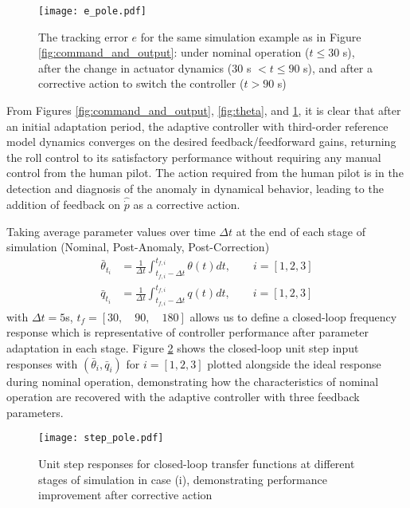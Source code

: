 \begin{figure}[h!]
	\centering
	\texttt{[image: e\_pole.pdf]}
	\caption{The tracking error $e$ for the same simulation example as in Figure \ref{fig:command_and_output}: under nominal operation ($t \leq 30$ s), after the change in actuator dynamics ($30$ s $< t \leq 90$ s), and after a corrective action to switch the controller ($t > 90$ s)}
	\label{fig:error}
\end{figure}

From Figures \ref{fig:command_and_output}, \ref{fig:theta}, and \ref{fig:error}, it is clear that after an initial adaptation period, the adaptive controller with third-order reference model dynamics converges on the desired feedback/feedforward gains, returning the roll control to its satisfactory performance without requiring any manual control from the human pilot. The action required from the human pilot is in the detection and diagnosis of the anomaly in dynamical behavior, leading to the addition of feedback on $\hat{\dot{p}}$ as a corrective action. 

Taking average parameter values over time $\Delta t$ at the end of each stage of simulation (Nominal, Post-Anomaly, Post-Correction)
\begin{align}
	\bar{\theta}_{t_i} &= \frac{1}{\Delta t} \int_{t_{f,i}-\Delta t}^{t_{f,i}} \theta(t) dt, \qquad i = [1, 2, 3] \label{eqn:theta_bar}\\
	\bar{q}_{t_i} &= \frac{1}{\Delta t} \int_{t_{f,i}-\Delta t}^{t_{f,i}} q(t) dt, \qquad i = [1, 2, 3] \label{eqn:q_bar}
\end{align}
with $\Delta t = 5$s, $t_f = [30, \quad 90, \quad 180]$ allows us to define a closed-loop frequency response which is representative of controller performance after parameter adaptation in each stage. Figure \ref{fig:step_pole} shows the closed-loop unit step input responses with $(\bar{\theta}_i, \bar{q}_i)$ for $i = [1, 2, 3]$ plotted alongside the ideal response during nominal operation, demonstrating how the characteristics of nominal operation are recovered with the adaptive controller with three feedback parameters.

\begin{figure}[h!]
	\centering
	\texttt{[image: step\_pole.pdf]}
	\caption{Unit step responses for closed-loop transfer functions at different stages of simulation in case (i), demonstrating performance improvement after corrective action}
	\label{fig:step_pole}
\end{figure}

